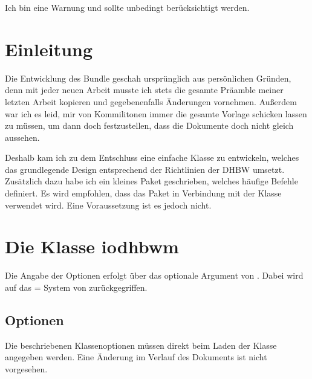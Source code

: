 \documentclass[babel=ngerman,highlight=false]{skdoc}
\begin{document}
    \begin{warning}{}
        Ich bin eine Warnung und sollte unbedingt berücksichtigt werden.
    \end{warning}


    \section{Einleitung}
        Die Entwicklung des Bundle geschah ursprünglich aus persönlichen Gründen, denn mit jeder neuen Arbeit musste ich stets die gesamte Präamble meiner letzten Arbeit kopieren und gegebenenfalls Änderungen vornehmen. Außerdem war ich es leid, mir von Kommilitonen immer die gesamte Vorlage schicken lassen zu müssen, um dann doch festzustellen, dass die Dokumente doch nicht gleich aussehen.

        Deshalb kam ich zu dem Entschluss eine einfache Klasse zu entwickeln, welches das grundlegende Design entsprechend der Richtlinien der DHBW umsetzt. Zusätzlich dazu habe ich ein kleines Paket geschrieben, welches häufige Befehle definiert. Es wird empfohlen, dass das Paket in Verbindung mit der Klasse verwendet wird. Eine Voraussetzung ist es jedoch nicht.

    \section{Die Klasse iodhbwm}\label{cls:iodhbwm}
        Die Angabe der Optionen erfolgt über das optionale Argument von .
        Dabei wird auf das = System von  zurückgegriffen.

        \subsection{Optionen}
            Die beschriebenen Klassenoptionen müssen direkt beim Laden der Klasse angegeben werden. Eine Änderung im Verlauf des Dokuments ist nicht vorgesehen.
\end{document}
